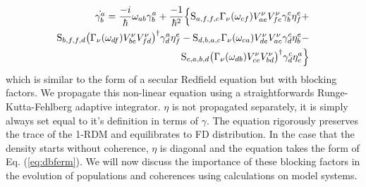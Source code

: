 \documentclass[aip,jcp,preprint,floatfix]{revtex4-1}
\begin{document}
{\begin{align}
\dot{\gamma_b^a} = \frac{-i}{\hbar}\omega_{ab}\gamma_b^a + \frac{-1}{\hbar^2} \Big\{ \text{S}_{a,f,f,c}\Gamma_\nu(\omega_{cf})V^\nu_{ae}V^\nu_{fc}\gamma^c_b\eta^e_f+\\ \notag
\text{S}_{b,f,f,d}\big(\Gamma_\nu(\omega_{df})V^\nu_{be}V^\nu_{fd}\big)^\dagger \gamma^a_d\eta^e_f- \text{S}_{d,b,a,c}\Gamma_\nu(\omega_{ca})V^\nu_{de}V^\nu_{ac}\gamma^c_d\eta^e_b-\\ \notag
\text{S}_{c,a,b,d}\big(\Gamma_\nu(\omega_{db})V^\nu_{ce}V^\nu_{bd}\big)^\dagger \gamma^c_d\eta^a_e \Big\}
\label{eq:fulleom}
\end{align}
which is similar to the form of a secular Redfield equation but with blocking factors. We propagate this non-linear equation using a straightforwards Runge-Kutta-Fehlberg adaptive integrator. $\eta$ is not propagated separately, it is simply always set equal to it's definition in terms of $\gamma$. The equation rigorously preserves the trace of the 1-RDM and equilibrates to FD distribution. In the case that the density starts without coherence, $\eta$ is diagonal and the equation takes the form of Eq. (\ref{eq:dbferm}). We will now discuss the importance of these blocking factors in the evolution of populations and coherences using calculations on model systems.
}
\end{document}
